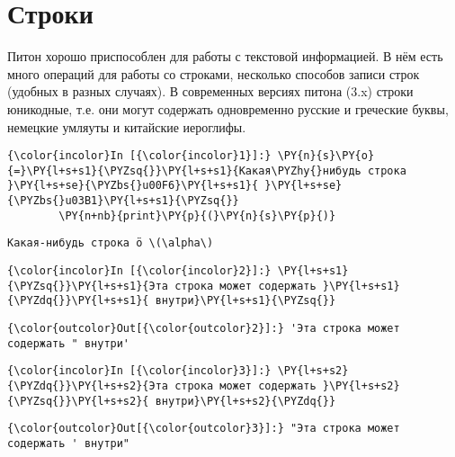 \section{Строки}
\label{S102}

Питон хорошо приспособлен для работы с текстовой информацией. В нём есть
много операций для работы со строками, несколько способов записи строк
(удобных в разных случаях). В современных версиях питона (3.x) строки
юникодные, т.е. они могут содержать одновременно русские и греческие
буквы, немецкие умляуты и китайские иероглифы.

    \begin{Verbatim}[commandchars=\\\{\}]
{\color{incolor}In [{\color{incolor}1}]:} \PY{n}{s}\PY{o}{=}\PY{l+s+s1}{\PYZsq{}}\PY{l+s+s1}{Какая\PYZhy{}нибудь строка }\PY{l+s+se}{\PYZbs{}u00F6}\PY{l+s+s1}{ }\PY{l+s+se}{\PYZbs{}u03B1}\PY{l+s+s1}{\PYZsq{}}
        \PY{n+nb}{print}\PY{p}{(}\PY{n}{s}\PY{p}{)}
\end{Verbatim}

    \begin{Verbatim}[commandchars=\\\{\}]
Какая-нибудь строка ö \(\alpha\)

    \end{Verbatim}

    \begin{Verbatim}[commandchars=\\\{\}]
{\color{incolor}In [{\color{incolor}2}]:} \PY{l+s+s1}{\PYZsq{}}\PY{l+s+s1}{Эта строка может содержать }\PY{l+s+s1}{\PYZdq{}}\PY{l+s+s1}{ внутри}\PY{l+s+s1}{\PYZsq{}}
\end{Verbatim}

            \begin{Verbatim}[commandchars=\\\{\}]
{\color{outcolor}Out[{\color{outcolor}2}]:} 'Эта строка может содержать " внутри'
\end{Verbatim}
        
    \begin{Verbatim}[commandchars=\\\{\}]
{\color{incolor}In [{\color{incolor}3}]:} \PY{l+s+s2}{\PYZdq{}}\PY{l+s+s2}{Эта строка может содержать }\PY{l+s+s2}{\PYZsq{}}\PY{l+s+s2}{ внутри}\PY{l+s+s2}{\PYZdq{}}
\end{Verbatim}

            \begin{Verbatim}[commandchars=\\\{\}]
{\color{outcolor}Out[{\color{outcolor}3}]:} "Эта строка может содержать ' внутри"
\end{Verbatim}
        
